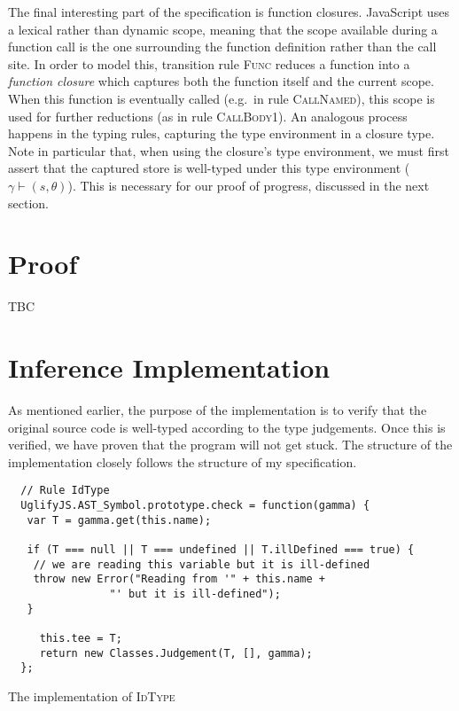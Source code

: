 \documentclass[12pt,a4paper,twoside,openright]{report}
\begin{document}
The final interesting part of the specification is function closures.
JavaScript uses a lexical rather than dynamic scope, meaning that the scope
available during a function call is the one surrounding the function definition
rather than the call site. In order to model this, transition rule
\textsc{Func} reduces a function into a \textit{function closure} which
captures both the function itself and the current scope. When this function is
eventually called (e.g.~in rule \textsc{CallNamed}), this scope is used for
further reductions (as in rule \textsc{CallBody1}). An analogous process
happens in the typing rules, capturing the type environment in a closure type.
Note in particular that, when using the closure's type environment, we must
first assert that the captured store is well-typed under this type environment
($\gamma \vdash (s, \theta)$). This is necessary for our proof of progress,
discussed in the next section.

\section{Proof}
TBC

\section{Inference Implementation}
As mentioned earlier, the purpose of the implementation is to verify that the
original source code is well-typed according to the type judgements. Once this
is verified, we have proven that the program will not get stuck. The structure
of the implementation closely follows the structure of my specification. 

\begin{program}[t]
 \begin{verbatim}
  // Rule IdType
  UglifyJS.AST_Symbol.prototype.check = function(gamma) {
   var T = gamma.get(this.name);
 
   if (T === null || T === undefined || T.illDefined === true) {
    // we are reading this variable but it is ill-defined
    throw new Error("Reading from '" + this.name +
                "' but it is ill-defined");
   }

	 this.tee = T;
	 return new Classes.Judgement(T, [], gamma);
  };
 \end{verbatim}
 \caption{The implementation of \textsc{IdType}}\label{lst:idimpl}
\end{program}
\end{document}
